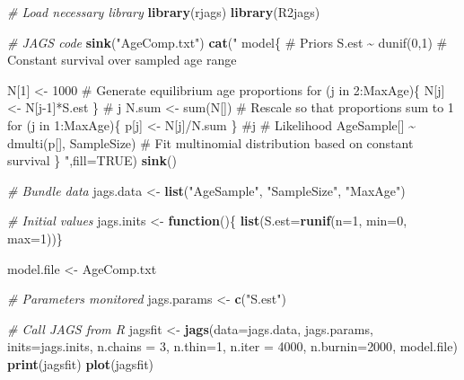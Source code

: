 \documentclass[
]{krantz}
\makeatletter
\newenvironment{Shaded}{\begin{snugshade}}{\end{snugshade}}
\newcommand{\AttributeTok}[1]{\textcolor[rgb]{0.27,0.27,0.27}{#1}}
\newcommand{\CommentTok}[1]{\textcolor[rgb]{0.37,0.37,0.37}{\textit{#1}}}
\newcommand{\ConstantTok}[1]{\textcolor[rgb]{0.37,0.37,0.37}{#1}}
\newcommand{\ControlFlowTok}[1]{\textcolor[rgb]{0.27,0.27,0.27}{\textbf{#1}}}
\newcommand{\DecValTok}[1]{\textcolor[rgb]{0.06,0.06,0.06}{#1}}
\newcommand{\FunctionTok}[1]{\textcolor[rgb]{0.27,0.27,0.27}{\textbf{#1}}}
\newcommand{\NormalTok}[1]{#1}
\newcommand{\OtherTok}[1]{\textcolor[rgb]{0.37,0.37,0.37}{#1}}
\newcommand{\StringTok}[1]{\textcolor[rgb]{0.5,0.5,0.5}{#1}}
\newenvironment{kframe}{%
\medskip{}
\setlength{\fboxsep}{.8em}
 \def\at@end@of@kframe{}%
 \ifinner\ifhmode%
  \def\at@end@of@kframe{\end{minipage}}%
  \begin{minipage}{\columnwidth}%
 \fi\fi%
 \def\FrameCommand##1{\hskip\@totalleftmargin \hskip-\fboxsep
 \colorbox{shadecolor}{##1}\hskip-\fboxsep
     \hskip-\linewidth \hskip-\@totalleftmargin \hskip\columnwidth}%
 \MakeFramed {\advance\hsize-\width
   \@totalleftmargin\z@ \linewidth\hsize
   \@setminipage}}%
 {\par\unskip\endMakeFramed%
 \at@end@of@kframe}
\renewenvironment{Shaded}{\begin{kframe}}{\end{kframe}}
\makeatother
\begin{document}
\begin{Shaded}
\begin{Highlighting}[]
\CommentTok{\# Load necessary library}
\FunctionTok{library}\NormalTok{(rjags)}
\FunctionTok{library}\NormalTok{(R2jags)}

\CommentTok{\# JAGS code}
\FunctionTok{sink}\NormalTok{(}\StringTok{"AgeComp.txt"}\NormalTok{)}
\FunctionTok{cat}\NormalTok{(}\StringTok{"}
\StringTok{model\{}
\StringTok{    \# Priors}
\StringTok{    S.est \textasciitilde{} dunif(0,1)  \# Constant survival over sampled age range}

\StringTok{    N[1] \textless{}{-} 1000}
\StringTok{    \# Generate equilibrium age proportions}
\StringTok{    for (j in 2:MaxAge)\{}
\StringTok{      N[j] \textless{}{-} N[j{-}1]*S.est}
\StringTok{    \} \# j}
\StringTok{    N.sum \textless{}{-} sum(N[]) \# Rescale so that proportions sum to 1}
\StringTok{    for (j in 1:MaxAge)\{}
\StringTok{    p[j] \textless{}{-} N[j]/N.sum}
\StringTok{    \} \#j}
\StringTok{    \# Likelihood}
\StringTok{    AgeSample[] \textasciitilde{} dmulti(p[], SampleSize)}
\StringTok{    \# Fit multinomial distribution based on constant survival}
\StringTok{\}}
\StringTok{    "}\NormalTok{,}\AttributeTok{fill=}\ConstantTok{TRUE}\NormalTok{)}
\FunctionTok{sink}\NormalTok{()}

\CommentTok{\# Bundle data}
\NormalTok{jags.data }\OtherTok{\textless{}{-}} \FunctionTok{list}\NormalTok{(}\StringTok{"AgeSample"}\NormalTok{, }\StringTok{"SampleSize"}\NormalTok{, }\StringTok{"MaxAge"}\NormalTok{)}

\CommentTok{\# Initial values}
\NormalTok{jags.inits }\OtherTok{\textless{}{-}} \ControlFlowTok{function}\NormalTok{()\{ }\FunctionTok{list}\NormalTok{(}\AttributeTok{S.est=}\FunctionTok{runif}\NormalTok{(}\AttributeTok{n=}\DecValTok{1}\NormalTok{, }\AttributeTok{min=}\DecValTok{0}\NormalTok{, }\AttributeTok{max=}\DecValTok{1}\NormalTok{))\}}

\NormalTok{model.file }\OtherTok{\textless{}{-}} \StringTok{\textquotesingle{}AgeComp.txt\textquotesingle{}}

\CommentTok{\# Parameters monitored}
\NormalTok{jags.params }\OtherTok{\textless{}{-}} \FunctionTok{c}\NormalTok{(}\StringTok{"S.est"}\NormalTok{)}

\CommentTok{\# Call JAGS from R}
\NormalTok{jagsfit }\OtherTok{\textless{}{-}} \FunctionTok{jags}\NormalTok{(}\AttributeTok{data=}\NormalTok{jags.data, jags.params, }\AttributeTok{inits=}\NormalTok{jags.inits,}
                \AttributeTok{n.chains =} \DecValTok{3}\NormalTok{, }\AttributeTok{n.thin=}\DecValTok{1}\NormalTok{, }\AttributeTok{n.iter =} \DecValTok{4000}\NormalTok{, }\AttributeTok{n.burnin=}\DecValTok{2000}\NormalTok{,}
\NormalTok{                model.file)}
\FunctionTok{print}\NormalTok{(jagsfit)}
\FunctionTok{plot}\NormalTok{(jagsfit)}


\end{Highlighting}
\end{Shaded}
\end{document}
